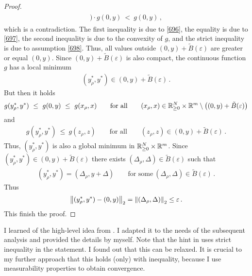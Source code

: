 \begin{proof}
\begin{align*}
\begin{split}
  )
  \cdot
  g
  (0,y)
  \ 
      <
  \ 
      g(0,y)
  \,    ,
      \end{split}
    \end{align*}
    which is a contradiction.
    The first inequality is due to \eqref{696}, the equality is due to \eqref{697}, the second inequality is due to the convexity of $g$,
    and the strict inequality is due to assumption \eqref{698}.
    Thus, all values outside 
    $(0,y)+\tilde{B}(\varepsilon)$
    are greater or equal $(0,y)$.
    Since 
    $(0,y)+\tilde{B}(\varepsilon)$
    is also compact, the continuous function $g$ has a local minimum
    \begin{gather*}
      (y^*_\rho,y^*)\in
    (0,y)+\tilde{B}(\varepsilon)
    \,.
    \end{gather*}
    But then it holds
    \begin{gather*}
      g
      (y^*_\rho,y^*)
      \ 
      \le
      \ 
      g(0,y)
      \ 
      \le
      \ 
      g
      (x_\rho,x)
      \qquad
      \text{for all}
      \qquad 
      (x_\rho,x)
      \in
\R^N_{\ge 0}\times\R^m\setminus 
\left(
  (0,y)
  +
    \tilde{B}(\varepsilon)
\right)
    \end{gather*}
    and
    \begin{gather*}
      g
      (y^*_\rho,y^*)
      \ 
      \le
      \ 
      g
      (z_\rho,z)
      \qquad
      \text{for all}
      \qquad 
      (z_\rho,z)
      \in
  (0,y)
  +
    \tilde{B}(\varepsilon)
    \,.
    \end{gather*}
    Thus,
    $
      (y^*_\rho,y^*)
    $
    is also a global minimum in
    $
\mathbb{R}^N_{\ge 0}\times\mathbb{R}^m
    $.
Since
    $
      (y^*_\rho,y^*)
      \in
  (0,y)
  +
    \tilde{B}(\varepsilon)
    $
    there exists
    $
    (\Delta_\rho,\Delta)\in
    \tilde{B}(\varepsilon)
    $
    such that 
    \begin{gather*}
      (y^*_\rho,y^*)
      =
      (\Delta_\rho,y+\Delta)
      \qquad
      \text{for some}\ 
      (\Delta_\rho,\Delta)
      \in
      \tilde{B}(\varepsilon)
      \,.
    \end{gather*}
  Thus
  \begin{gather*}
    \left\lVert
      (y^*_\rho,y^*)
      -
      (0,y)
    \right\rVert_2
    =
    \left\lVert
      (\Delta_\rho,\Delta)
    \right\rVert_2
    \le \varepsilon
    \,.
  \end{gather*}
  This finish the proof.
\end{proof}
\begin{remark}
  I learned of the high-level idea from \cite[page 22]{Wang2019}.
  I adapted it to the needs of the subsequent analysis and provided the details by myself.
  Note that the hint in \cite[page 22]{Wang2019}
  uses strict inequality in the statement.
  I found out that this can be relaxed.
  It is crucial to my further approach that this holds (only) with inequality, because I use measurability properties to obtain convergence.
\end{remark}
